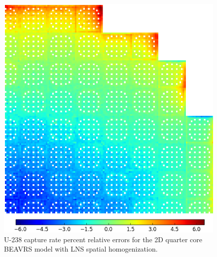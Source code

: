 \begin{figure}[h!]
\centering
\includegraphics[width=\linewidth]{figures/patterns/lns/full-core/capt-err-lns}
\vspace{2mm}
\caption[U-238 capture rate absolute errors for \ac{BEAVRS} with LNS homogenization]{U-238 capture rate percent relative errors for the 2D quarter core \ac{BEAVRS} model with \ac{LNS} spatial homogenization.}
\label{fig:chap9-full-core-capt-err-lns}
\end{figure}

\clearpage

